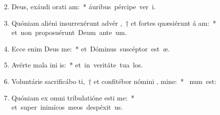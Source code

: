 \begin{flushleft}
\begin{enumerate}[leftmargin=*]
\setcounter{enumi}{1}

\item Deus, exáudi orati am:~* \mbox{áuribus pércipe ver  i.}
\item Quóniam aliéni insurrexérunt advér ,~† et fortes quæsiérunt á am:~* \mbox{et non proposuérunt Deum ante  um.}
\item Ecce enim Deus  me:~* \mbox{et Dóminus suscéptor est  æ.}
\item Avérte mala ini is:~* \mbox{et in veritáte tua  los.}
\item Voluntárie sacrificábo ti,~† et confitébor nómini , mine:~* \mbox{ num est:}
\item Quóniam ex omni tribulatióne esti me:~* \mbox{et super inimícos meos despéxit  us.}

\end{enumerate}
\end{flushleft}

